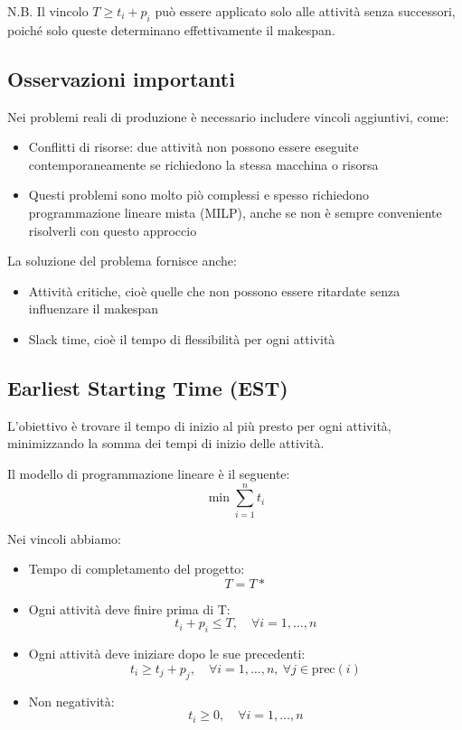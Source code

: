 N.B. Il vincolo $T \geq t_i + p_i$ può essere applicato solo alle attività 
senza successori, poiché solo queste determinano effettivamente il makespan.

\subsection{Osservazioni importanti}
Nei problemi reali di produzione è necessario includere vincoli aggiuntivi, come:
\begin{itemize}
    \item Conflitti di risorse: due attività non possono essere eseguite contemporaneamente se richiedono la stessa macchina o risorsa
    \item Questi problemi sono molto piò complessi e spesso richiedono programmazione lineare mista (MILP), anche se non è sempre conveniente risolverli con questo approccio
\end{itemize}

La soluzione del problema fornisce anche:
\begin{itemize}
    \item Attività critiche, cioè quelle che non possono essere ritardate senza influenzare il makespan
    \item Slack time, cioè il tempo di flessibilità per ogni attività
\end{itemize}

\subsection{Earliest Starting Time (EST)}

L'obiettivo è trovare il tempo di inizio al più presto per ogni attività, 
minimizzando la somma dei tempi di inizio delle attività.

Il modello di programmazione lineare è il seguente:
\[ 
\min \sum_{i=1}^n t_i
\]

Nei vincoli abbiamo:
\begin{itemize}
    \item Tempo di completamento del progetto:
    \[T = T*\]
    \item Ogni attività deve finire prima di T:
    \[t_i + p_i \leq T, \quad \forall i = 1,\ldots,n\]
    \item Ogni attività deve iniziare dopo le sue precedenti:
    \[t_i \geq t_j + p_j, \quad \forall i = 1,\ldots,n,\ \forall j \in \text{prec}(i)\]
    \item Non negatività:
    \[t_i \geq 0, \quad \forall i = 1,\ldots,n\]
\end{itemize}


